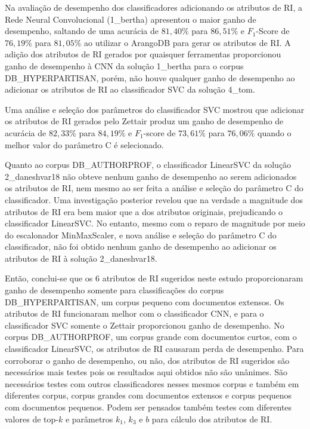 Na avaliação de desempenho dos classificadores adicionando os atributos de RI, a Rede Neural Convolucional (1\_bertha) apresentou o maior ganho de desempenho, saltando de uma acurácia de $81,40\%$ para $86,51\%$ e $F_1$-Score de $76,19\%$ para $81,05\%$ ao utilizar o ArangoDB para gerar os atributos de RI.
A adição dos atributos de RI gerados por quaisquer ferramentas proporcionou ganho de desempenho à CNN da solução 1\_bertha para o corpus DB\_HYPERPARTISAN, porém, não houve qualquer ganho de desempenho ao adicionar os atributos de RI ao classificador SVC da solução 4\_tom.

Uma análise e seleção dos parâmetros do classificador SVC mostrou que adicionar os atributos de RI gerados pelo Zettair produz um ganho de desempenho de acurácia de $82,33\%$ para $84,19\%$ e $F_1$-score de $73,61\%$ para $76,06\%$ quando o melhor valor do parâmetro C é selecionado.

Quanto ao corpus DB\_AUTHORPROF, o classificador LinearSVC da solução 2\_daneshvar18 não obteve nenhum ganho de desempenho ao serem adicionados os atributos de RI, nem mesmo ao ser feita a análise e seleção do parâmetro C do classificador.
Uma investigação posterior revelou que na verdade a magnitude dos atributos de RI era bem maior que a dos atributos originais, prejudicando o classificador LinearSVC.
No entanto, mesmo com o reparo de magnitude por meio do escalonador MinMaxScaler, e nova análise e seleção do parâmetro C do classificador, não foi obtido nenhum ganho de desempenho ao adicionar os atributos de RI à solução 2\_daneshvar18.

Então, conclui-se que os 6 atributos de RI sugeridos neste estudo proporcionaram ganho de desempenho somente para classificações do corpus DB\_HYPERPARTISAN, um corpus pequeno com documentos extensos.
Os atributos de RI funcionaram melhor com o classificador CNN, e para o classificador SVC somente o Zettair proporcionou ganho de desempenho.
No corpus DB\_AUTHORPROF, um corpus grande com documentos curtos, com o classificador LinearSVC, os atributos de RI causaram perda de desempenho.
Para corroborar o ganho de desempenho, ou não, dos atributos de RI sugeridos são necessários mais testes pois os resultados aqui obtidos não são unânimes.
São necessários testes com outros classificadores nesses mesmos corpus e também em diferentes corpus, corpus grandes com documentos extensos e corpus pequenos com documentos pequenos. 
Podem ser pensados também testes com diferentes valores de top-$k$ e parâmetros $k_1$, $k_3$ e $b$ para cálculo dos atributos de RI.

